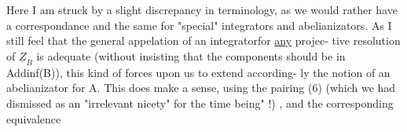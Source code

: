 Here I am struck by a slight discrepancy in terminology, as we
would rather have a correspondance
and the same for "special" integrators and abelianizators. As I still
feel that the general  appelation of an integratorfor \uline{any} projec-%
tive resolution of $\underline{Z}_B$ is adequate (without insisting that the components
should be in Addinf(B)), this kind of forces upon us to extend according-%
ly  the notion of an abelianizator for A. This does make a sense, using
the pairing (6) (which we had dismissed as an "irrelevant nicety" for
the time being" !) , and the corresponding equivalence

